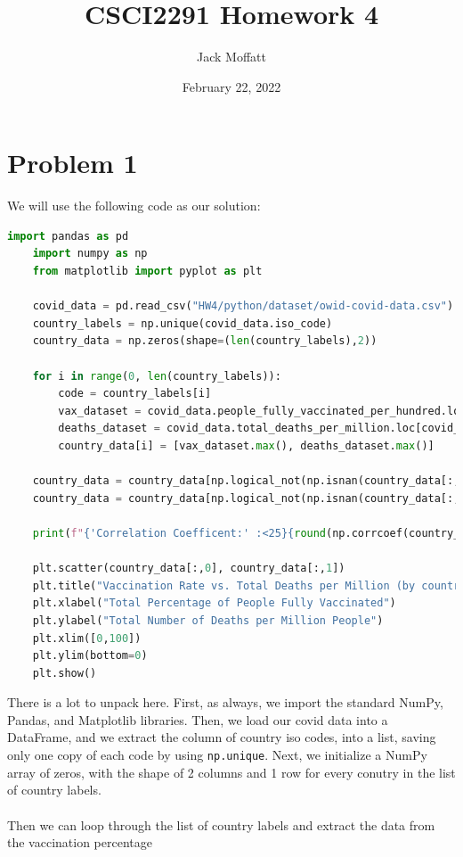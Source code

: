 \documentclass[12pt, letterpaper]{article}
\title{CSCI2291 Homework 4}
\author{Jack Moffatt}
\date{February 22, 2022}
\begin{document}
\maketitle
\noindent\makebox[\linewidth]{\rule{18cm}{0.4pt}}

\section*{Problem 1}
We will use the following code as our solution:
\begin{lstlisting}[language=python]
    import pandas as pd
    import numpy as np
    from matplotlib import pyplot as plt
    
    covid_data = pd.read_csv("HW4/python/dataset/owid-covid-data.csv")
    country_labels = np.unique(covid_data.iso_code)
    country_data = np.zeros(shape=(len(country_labels),2))
    
    for i in range(0, len(country_labels)):
        code = country_labels[i]
        vax_dataset = covid_data.people_fully_vaccinated_per_hundred.loc[covid_data.iso_code == code]
        deaths_dataset = covid_data.total_deaths_per_million.loc[covid_data.iso_code == code]
        country_data[i] = [vax_dataset.max(), deaths_dataset.max()]
    
    country_data = country_data[np.logical_not(np.isnan(country_data[:,0]))]
    country_data = country_data[np.logical_not(np.isnan(country_data[:,1]))]
    
    print(f"{'Correlation Coefficent:' :<25}{round(np.corrcoef(country_data, rowvar=False)[0][1], 3)}")
    
    plt.scatter(country_data[:,0], country_data[:,1])
    plt.title("Vaccination Rate vs. Total Deaths per Million (by country)")
    plt.xlabel("Total Percentage of People Fully Vaccinated")
    plt.ylabel("Total Number of Deaths per Million People")
    plt.xlim([0,100])
    plt.ylim(bottom=0)
    plt.show()
\end{lstlisting}
There is a lot to unpack here. First, as always, we import the standard NumPy, Pandas, and Matplotlib libraries. 
Then, we load our covid data into a DataFrame, and we extract the column of country iso codes, into a list, saving 
only one copy of each code by using \texttt{np.unique}. Next, we initialize a NumPy array of zeros, with the shape of 
2 columns and 1 row for every conutry in the list of country labels.  \\ \\
Then we can loop through the list of country labels and extract the data from the vaccination percentage 
\end{document}
